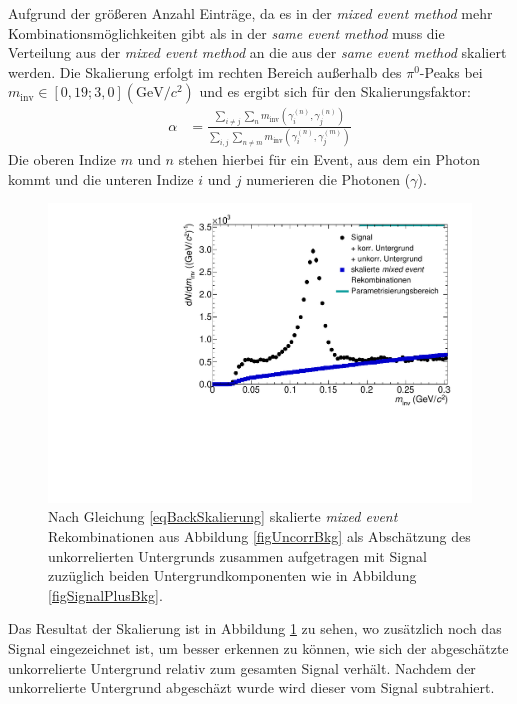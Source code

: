 Aufgrund der gr{\"o}{\ss}eren Anzahl Eintr{\"a}ge, da es in der \textit{mixed event method} mehr Kombinationsm\"oglichkeiten gibt als in der \textit{same event method} muss die Verteilung aus der \textit{mixed event method} an die aus der \textit{same event method} skaliert werden.
Die Skalierung erfolgt im rechten Bereich au{\ss}erhalb des $\pi^{0}$-Peaks bei $m_\text{inv} \in \left[0,19;3,0\right] (\text{GeV/}c^{2})$ und es ergibt sich f{\"u}r den Skalierungsfaktor:
\begin{align}
\label{eqBackSkalierung}
\alpha &= \frac{\sum_{i \neq j}\sum_{n}m_{\text{inv}}\left( \gamma^{(n)}_{i},\gamma^{(n)}_{j}\right) }{\sum_{i,j}\sum_{n \neq m}m_{\text{inv}}\left( \gamma^{(n)}_{i},\gamma^{(m)}_{j}\right) }
\end{align}
Die oberen Indize $m$ und $n$ stehen hierbei f{\"u}r ein Event, aus dem ein Photon kommt und die unteren Indize $i$ und $j$ numerieren die Photonen ($\gamma$).
\begin{figure}[tp]
\centering
\includegraphics[width=.75\linewidth]{hUncorrBkgNorm.pdf}
\caption{Nach Gleichung \ref{eqBackSkalierung} skalierte {\it mixed event} Rekombinationen aus Abbildung \ref{figUncorrBkg} als Absch{\"a}tzung des unkorrelierten Untergrunds zusammen aufgetragen mit Signal zuz{\"u}glich beiden Untergrundkomponenten wie in Abbildung \ref{figSignalPlusBkg}.}
\label{figUncorrBkgNorm}
\end{figure}
\newline
Das Resultat der Skalierung ist in Abbildung \ref{figUncorrBkgNorm} zu sehen, wo zus{\"a}tzlich noch das Signal eingezeichnet ist, um besser erkennen zu k{\"o}nnen, wie sich der abgesch{\"a}tzte unkorrelierte Untergrund relativ zum gesamten Signal verh{\"a}lt.
Nachdem der unkorrelierte Untergrund abgesch\"azt wurde wird dieser vom Signal subtrahiert.
